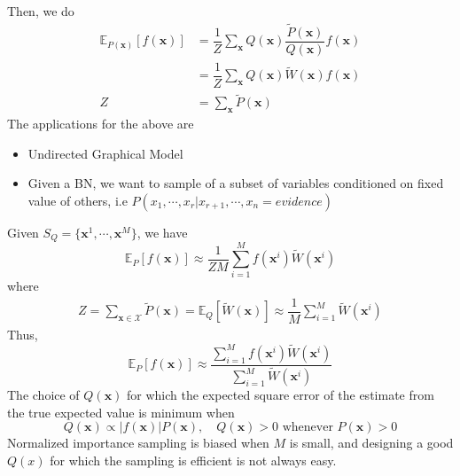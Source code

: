 Then, we do
\begin{align*}
		\mathbb{E}_{P(\mathbf x)}[f(\mathbf x)] &= \dfrac{1}{Z} \sum_\mathbf{x} Q(\mathbf x) \dfrac{\widetilde{P}(\mathbf x)}{Q(\mathbf x)}f(\mathbf x) \\
		&= \dfrac{1}{Z} \sum_\mathbf{x} Q(\mathbf x) \widetilde{W}(\mathbf x)f(\mathbf x) \\
		Z &= \sum_{\mathbf x} \widetilde{P}(\mathbf x) 
\end{align*}
The applications for the above are
\begin{itemize}
	\item Undirected Graphical Model
	\item Given a BN, we want to sample of a subset of variables conditioned on fixed value of others, i.e $P(x_1, \cdots, x_r | x_{r+1}, \cdots, x_n = evidence)$
\end{itemize}
Given $S_Q = \{\mathbf x^1, \cdots, \mathbf x^M\}$, we have
\begin{equation}
	\mathbb{E}_P [f(\mathbf x)] \approx \dfrac{1}{ZM} \sum_{i=1}^M f(\mathbf x^i) \widetilde{W}(\mathbf x^i)
\end{equation}
where
\begin{eqnarray}
	Z = \sum_{\mathbf x \in \mathcal X} \widetilde{P}(\mathbf x) = \mathbb{E}_Q [\widetilde{W}(\mathbf x)] \approx \dfrac{1}{M} \sum_{i=1}^M \widetilde{W}(\mathbf x^i)
\end{eqnarray}
Thus,
\begin{equation}
	\mathbb{E}_P [f(\mathbf x)] \approx \dfrac{\sum_{i=1}^M f(\mathbf x^i) \widetilde{W}(\mathbf x^i)}{\sum_{i=1}^M \widetilde{W}(\mathbf x^i)}
\end{equation}
The choice of $Q(\mathbf x)$ for which the expected square error of the estimate from the true expected value is minimum when
\begin{equation}
	Q(\mathbf x) \propto |f(\mathbf x)| P(\mathbf x) , \quad Q(\mathbf x) > 0 \text{ whenever } P(\mathbf x) > 0
\end{equation}
Normalized importance sampling is biased when $M$ is small, and designing a good $Q(x)$ for which the sampling is efficient is not always easy.
